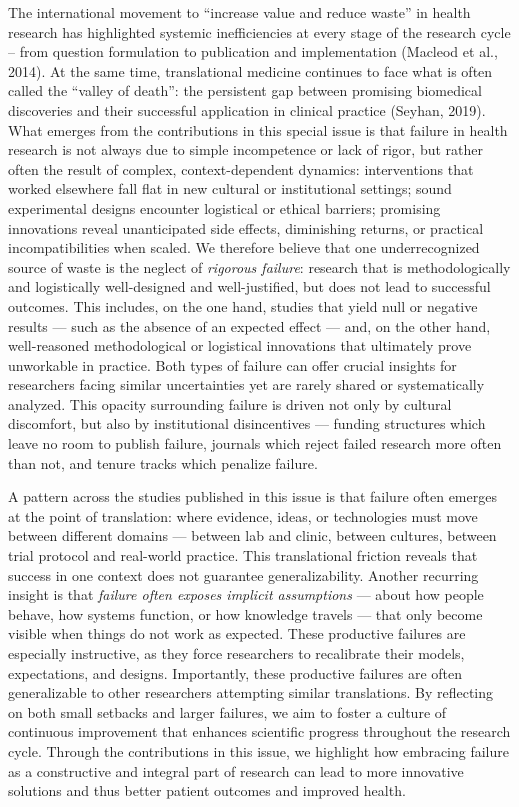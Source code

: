 \documentclass[authordate, empirical, issue]{jote-new-article}
\begin{document}
	The international movement to “increase value and reduce waste” in health research has highlighted systemic inefficiencies at every stage of the research cycle -- from question formulation to publication and implementation (Macleod et al., 2014). At the same time, translational medicine continues to face what is often called the “valley of death”: the persistent gap between promising biomedical discoveries and their successful application in clinical practice (Seyhan, 2019). What emerges from the contributions in this special issue is that failure in health research is not always due to simple incompetence or lack of rigor, but rather often the result of complex, context-dependent dynamics: interventions that worked elsewhere fall flat in new cultural or institutional settings; sound experimental designs encounter logistical or ethical barriers; promising innovations reveal unanticipated side effects, diminishing returns, or practical incompatibilities when scaled. We therefore believe that one underrecognized source of waste is the neglect of \emph{rigorous failure}: research that is methodologically and logistically well-designed and well-justified, but does not lead to successful outcomes. This includes, on the one hand, studies that yield null or negative results — such as the absence of an expected effect — and, on the other hand, well-reasoned methodological or logistical innovations that ultimately prove unworkable in practice. Both types of failure can offer crucial insights for researchers facing similar uncertainties yet are rarely shared or systematically analyzed. This opacity surrounding failure is driven not only by cultural discomfort, but also by institutional disincentives — funding structures which leave no room to publish failure, journals which reject failed research more often than not, and tenure tracks which penalize failure.



	A pattern across the studies published in this issue is that failure often emerges at the point of translation: where evidence, ideas, or technologies must move between different domains — between lab and clinic, between cultures, between trial protocol and real-world practice. This translational friction reveals that success in one context does not guarantee generalizability. Another recurring insight is that \emph{failure often exposes implicit assumptions} — about how people behave, how systems function, or how knowledge travels — that only become visible when things do not work as expected. These productive failures are especially instructive, as they force researchers to recalibrate their models, expectations, and designs. Importantly, these productive failures are often generalizable to other researchers attempting similar translations. By reflecting on both small setbacks and larger failures, we aim to foster a culture of continuous improvement that enhances scientific progress throughout the research cycle. Through the contributions in this issue, we highlight how embracing failure as a constructive and integral part of research can lead to more innovative solutions and thus better patient outcomes and improved health.
\end{document}
